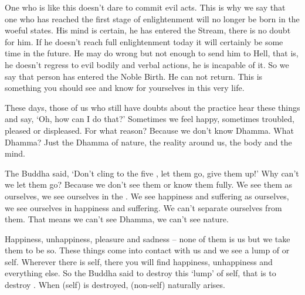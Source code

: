 One who is like this doesn't dare to commit evil acts. This is why we say that one who has reached the first stage of enlightenment will no longer be born in the woeful states. His mind is certain, he has entered the Stream, there is no doubt for him. If he doesn't reach full enlightenment today it will certainly be some time in the future. He may do wrong but not enough to send him to Hell, that is, he doesn't regress to evil bodily and verbal actions, he is incapable of it. So we say that person has entered the Noble Birth. He can not return. This is something you should see and know for yourselves in this very life. 

These days, those of us who still have doubts about the practice hear these things and say, `Oh, how can I do that?' Sometimes we feel happy, sometimes troubled, pleased or displeased. For what reason? Because we don't know Dhamma. What Dhamma? Just the Dhamma of nature, the reality around us, the body and the mind. 

The Buddha said, `Don't cling to the five , let them go, give them up!' Why can't we let them go? Because we don't see them or know them fully. We see them as ourselves, we see ourselves in the . We see happiness and suffering as ourselves, we see ourselves in happiness and suffering. We can't separate ourselves from them. That means we can't see Dhamma, we can't see nature. 

Happiness, unhappiness, pleasure and sadness -- none of them is us but we take them to be so. These things come into contact with us and we see a lump of  or self. Wherever there is self, there you will find happiness, unhappiness and everything else. So the Buddha said to destroy this `lump' of self, that is to destroy . When  (self) is destroyed,  (non-self) naturally arises. 

